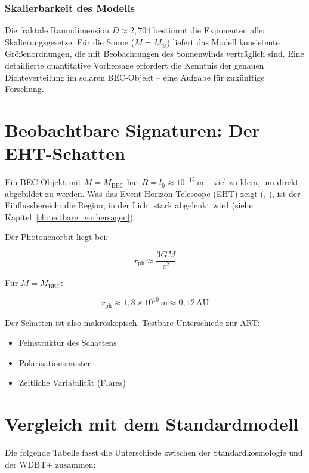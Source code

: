 \subsubsection{Skalierbarkeit des Modells}
\label{sub:kosmo_skalierbarkeit}

Die fraktale Raumdimension \( D \approx 2,704 \) bestimmt die 
Exponenten aller Skalierungsgesetze. Für die Sonne (\( M = M_{\odot} \)) 
liefert das Modell konsistente Größenordnungen, die mit 
Beobachtungen des Sonnenwinds verträglich sind. Eine detaillierte 
quantitative Vorhersage erfordert die Kenntnis der genauen 
Dichteverteilung im solaren BEC-Objekt – eine Aufgabe für 
zukünftige Forschung.

\section{Beobachtbare Signaturen: Der EHT-Schatten}
\label{sec:kosmo_eht}

Ein BEC-Objekt mit \( M = M_{\text{BEC}} \) hat \( R = l_0 \approx 10^{-15} \, \text{m} \) – viel zu klein, um direkt abgebildet zu werden. Was das Event Horizon Telescope (EHT) zeigt (\cite{EHT2019}, \cite{EHT2022}), ist der Einflussbereich: die Region, in der Licht stark abgelenkt wird (siehe Kapitel~\ref{ch:testbare_vorhersagen}).

Der Photonenorbit liegt bei:

\[
r_{\text{ph}} \approx \frac{3GM}{c^2}
\]

Für \( M = M_{\text{BEC}} \):

\[
r_{\text{ph}} \approx 1,8 \times 10^{10} \, \text{m} \approx 0,12 \, \text{AU}
\]

Der Schatten ist also makroskopisch. Testbare Unterschiede zur ART:

\begin{itemize}
    \item Feinstruktur des Schattens
    \item Polarisationsmuster
    \item Zeitliche Variabilität (Flares)
\end{itemize}

\section{Vergleich mit dem Standardmodell}
\label{sec:kosmo_vergleich}

Die folgende Tabelle fasst die Unterschiede zwischen der Standardkosmologie und der WDBT+ zusammen:

